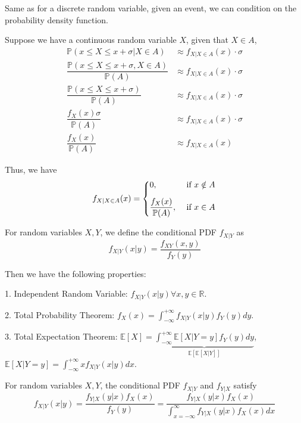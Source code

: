 \newpage
Same as for a discrete random variable, given an event, we can condition on the probability density function.  

Suppose we have a continuous random variable \(X\), given that \(X \in A\),
\[
\begin{aligned}
    \mathbb{P}(x \leq X \leq x + \sigma \vert X \in A) &\approx f_{X \vert X \in A} (x) \cdot \sigma \\
    \dfrac{\mathbb{P}(x \leq X \leq x + \sigma, X \in A)}{\mathbb{P}(A)} &\approx f_{X \vert X \in A} (x) \cdot \sigma \\
    \dfrac{\mathbb{P}(x \leq X \leq x + \sigma)}{\mathbb{P}(A)} &\approx f_{X \vert X \in A} (x) \cdot \sigma \\
    \dfrac{f_X(x) \sigma}{\mathbb{P}(A)} &\approx f_{X \vert X \in A} (x) \cdot \sigma \\
    \dfrac{f_X(x)}{\mathbb{P}(A)} &\approx f_{X \vert X \in A} (x)
\end{aligned} 
\] 

Thus, we have 
\[
    f_{X \vert X \in A} (x) = \begin{dcases}
       0 , &\text{ if } x \notin A \\[5pt]
       \dfrac{f_X(x)}{\mathbb{P}(A)} , &\text{ if } x \in A 
    \end{dcases}
\]

\begin{definition}
    For random variables \(X, Y\), we define the conditional PDF \(f_{X \vert Y}\) as 
    \[
        f_{X \vert Y}(x \vert y) = \dfrac{f_{XY}(x, y)}{f_Y(y)}
    \]
\end{definition}

Then we have the following properties: 

1. Independent Random Variable: \(f_{X \vert Y}(x \vert y) \forall x, y \in \mathbb{R}\). 

2. Total Probability Theorem: \(f_X(x) = \displaystyle\int_{-\infty}^{+\infty} f_{X \vert Y}(x \vert y) f_Y(y) dy\). 

3. Total Expectation Theorem: \(\mathbb{E}[X] = \underbrace{\int_{-\infty}^{+\infty} \mathbb{E}[X \vert Y = y] f_Y(y) dy}_{\mathbb{E}[\mathbb{E}[X \vert Y]]}\), \(\mathbb{E}[X \vert Y = y] = \int_{-\infty}^{+\infty} x f_{X\vert Y} (x \vert y) dx\). 

\begin{theorem}
    For random variables \(X, Y\), the conditional PDF \(f_{X \vert Y}\) and \(f_{Y \vert X}\) satisfy 
    \[
        f_{X \vert Y} (x \vert y) = \dfrac{f_{Y \vert X}(y \vert x) f_X(x)}{f_Y(y)} = \dfrac{f_{Y \vert X}(y \vert x) f_X(x)}{\displaystyle\int_{x = -\infty}^{\infty} f_{Y \vert X}(y \vert x) f_X(x) dx}
    \]
\end{theorem}


